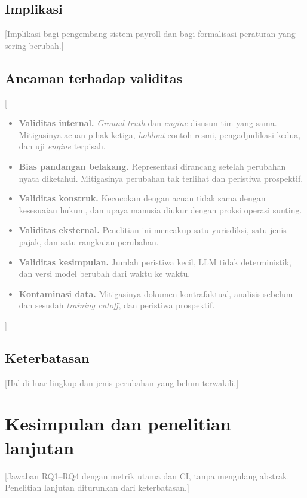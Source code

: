 \documentclass[journal,a4paper]{IEEEtran}
\newcommand{\en}[1]{\textit{#1}}
\newif\ifrancangan \rancangantrue
\newcommand{\isian}[1]{\ifrancangan\textcolor{gray}{[#1]}\fi}
\begin{document}
\subsection{Implikasi}
\isian{Implikasi bagi pengembang sistem payroll dan bagi formalisasi peraturan yang sering berubah.}

\subsection{Ancaman terhadap validitas}
\isian{
\begin{itemize}[leftmargin=*,nosep]
  \item \textbf{Validitas internal.} \en{Ground truth} dan \en{engine} disusun tim yang sama. Mitigasinya acuan pihak ketiga, \en{holdout} contoh resmi, pengadjudikasi kedua, dan uji \en{engine} terpisah.
  \item \textbf{Bias pandangan belakang.} Representasi dirancang setelah perubahan nyata diketahui. Mitigasinya perubahan tak terlihat dan peristiwa prospektif.
  \item \textbf{Validitas konstruk.} Kecocokan dengan acuan tidak sama dengan kesesuaian hukum, dan upaya manusia diukur dengan proksi operasi sunting.
  \item \textbf{Validitas eksternal.} Penelitian ini mencakup satu yurisdiksi, satu jenis pajak, dan satu rangkaian perubahan.
  \item \textbf{Validitas kesimpulan.} Jumlah peristiwa kecil, LLM tidak deterministik, dan versi model berubah dari waktu ke waktu.
  \item \textbf{Kontaminasi data.} Mitigasinya dokumen kontrafaktual, analisis sebelum dan sesudah \en{training cutoff}, dan peristiwa prospektif.
\end{itemize}}

\subsection{Keterbatasan}
\isian{Hal di luar lingkup dan jenis perubahan yang belum terwakili.}

\section{Kesimpulan dan penelitian lanjutan}
\label{sec:kesimpulan}
\isian{Jawaban RQ1--RQ4 dengan metrik utama dan CI, tanpa mengulang abstrak. Penelitian lanjutan diturunkan dari keterbatasan.}
\end{document}
